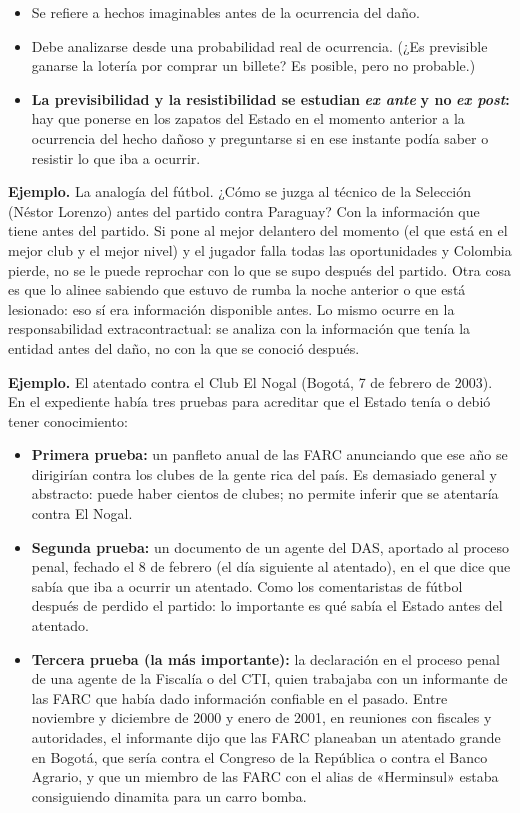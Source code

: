 \begin{itemize}
\item Se refiere a hechos imaginables antes de la ocurrencia del daño.
\item Debe analizarse desde una probabilidad real de ocurrencia. (¿Es previsible ganarse la lotería por comprar un billete? Es posible, pero no probable.)
\item \textbf{La previsibilidad y la resistibilidad se estudian }\textbf{\textit{ex ante}}\textbf{ y no }\textbf{\textit{ex post}}\textbf{:} hay que ponerse en los zapatos del Estado en el momento anterior a la ocurrencia del hecho dañoso y preguntarse si en ese instante podía saber o resistir lo que iba a ocurrir.
\end{itemize}
\begin{ejemplo}
\textcolor[HTML]{4F6228}{\textbf{Ejemplo. }}La analogía del fútbol. ¿Cómo se juzga al técnico de la Selección (Néstor Lorenzo) antes del partido contra Paraguay? Con la información que tiene antes del partido. Si pone al mejor delantero del momento (el que está en el mejor club y el mejor nivel) y el jugador falla todas las oportunidades y Colombia pierde, no se le puede reprochar con lo que se supo después del partido. Otra cosa es que lo alinee sabiendo que estuvo de rumba la noche anterior o que está lesionado: eso sí era información disponible antes. Lo mismo ocurre en la responsabilidad extracontractual: se analiza con la información que tenía la entidad antes del daño, no con la que se conoció después.
\par
\textcolor[HTML]{4F6228}{\textbf{Ejemplo. }}El atentado contra el Club El Nogal (Bogotá, 7 de febrero de 2003). En el expediente había tres pruebas para acreditar que el Estado tenía o debió tener conocimiento:
\end{ejemplo}
\begin{itemize}
\item \textbf{Primera prueba:} un panfleto anual de las FARC anunciando que ese año se dirigirían contra los clubes de la gente rica del país. Es demasiado general y abstracto: puede haber cientos de clubes; no permite inferir que se atentaría contra El Nogal.
\item \textbf{Segunda prueba:} un documento de un agente del DAS, aportado al proceso penal, fechado el 8 de febrero (el día siguiente al atentado), en el que dice que sabía que iba a ocurrir un atentado. Como los comentaristas de fútbol después de perdido el partido: lo importante es qué sabía el Estado antes del atentado.
\item \textbf{Tercera prueba (la más importante):} la declaración en el proceso penal de una agente de la Fiscalía o del CTI, quien trabajaba con un informante de las FARC que había dado información confiable en el pasado. Entre noviembre y diciembre de 2000 y enero de 2001, en reuniones con fiscales y autoridades, el informante dijo que las FARC planeaban un atentado grande en Bogotá, que sería contra el Congreso de la República o contra el Banco Agrario, y que un miembro de las FARC con el alias de «Herminsul» estaba consiguiendo dinamita para un carro bomba.
\end{itemize}
